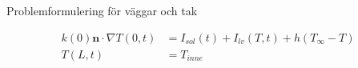 \begin{frame}{Problemformulering för väggar och tak}

\begin{align}
k(0)\mathbf{n}\cdot\nabla T(0,t) & = I_{sol}(t) + I_{lv}(T,t) + h(T_\infty-T)
\nonumber \\[20pt]
T(L,t) & = T_{inne} \nonumber 
\end{align}


\end{frame}

